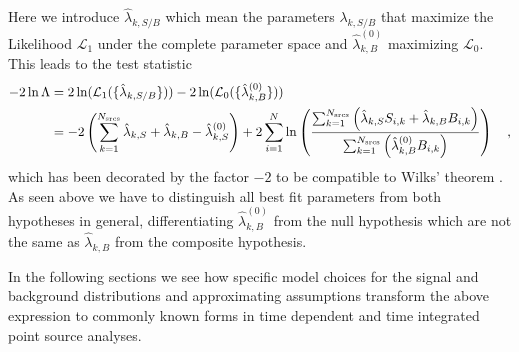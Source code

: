 Here we introduce $\hat{\lambda}_{k,S/B}$ which mean the parameters $\lambda_{k,S/B}$ that maximize the Likelihood $\mathcal{L}_1$ under the complete parameter space and $\hat{\lambda}_{k,B}^{(0)}$ maximizing $\mathcal{L}_0$.
This leads to the test statistic
\begin{equation}
  \begin{aligned}
    -2\ln\Lambda
    &= 2\ln(\mathcal{L}_1(\{\hat{\lambda}_{k,S/B}\})) -
       2\ln(\mathcal{L}_0(\{\hat{\lambda}^{(0)}_{k,B}\})) \\
    &= -2\left(\sum_{k=1}^{N_\text{srcs}}\hat{\lambda}_{k,S} +
                                         \hat{\lambda}_{k,B} -
                                         \hat{\lambda}_{k,S}^{(0)}\right) +
      2\sum_{i=1}^N \ln\left(
        \frac{\sum_{k=1}^{N_\text{srcs}}\left(
            \hat{\lambda}_{k,S} S_{i,k}+\hat{\lambda}_{k,B} B_{i,k}\right)}
            {\sum_{k=1}^{N_\text{srcs}}\left(
              \hat{\lambda}_{k,B}^{(0)} B_{i,k}
            \right)}
          \right)
    \quad\text{,}
  \end{aligned}
\end{equation}
which has been decorated by the factor $-2$ to be compatible to Wilks' theorem .
As seen above we have to distinguish all best fit parameters from both hypotheses in general, differentiating $\hat{\lambda}_{k,B}^{(0)}$ from the null hypothesis which are not the same as $\hat{\lambda}_{k,B}$ from the composite hypothesis.

In the following sections we see how specific model choices for the signal and background distributions and approximating assumptions transform the above expression to commonly known forms in time dependent and time integrated point source analyses.

